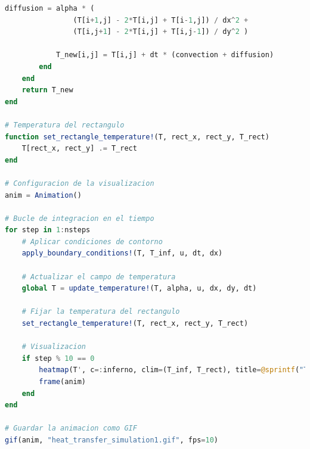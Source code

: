 \begin{lstlisting}[language=Julia]
            diffusion = alpha * (
                (T[i+1,j] - 2*T[i,j] + T[i-1,j]) / dx^2 +
                (T[i,j+1] - 2*T[i,j] + T[i,j-1]) / dy^2 )
            
            T_new[i,j] = T[i,j] + dt * (convection + diffusion)
        end
    end
    return T_new
end

# Temperatura del rectangulo
function set_rectangle_temperature!(T, rect_x, rect_y, T_rect)
    T[rect_x, rect_y] .= T_rect
end

# Configuracion de la visualizacion
anim = Animation()

# Bucle de integracion en el tiempo
for step in 1:nsteps
    # Aplicar condiciones de contorno
    apply_boundary_conditions!(T, T_inf, u, dt, dx)

    # Actualizar el campo de temperatura
    global T = update_temperature!(T, alpha, u, dx, dy, dt)

    # Fijar la temperatura del rectangulo
    set_rectangle_temperature!(T, rect_x, rect_y, T_rect)

    # Visualizacion
    if step % 10 == 0
        heatmap(T', c=:inferno, clim=(T_inf, T_rect), title=@sprintf("Time: %.3f s", step*dt))
        frame(anim)
    end
end

# Guardar la animacion como GIF
gif(anim, "heat_transfer_simulation1.gif", fps=10)

\end{lstlisting}
